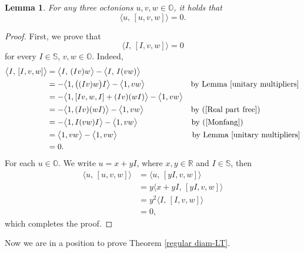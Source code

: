 \documentclass{amsart}
\newtheorem{lemma}[theorem]{Lemma}
\theoremstyle{definition}
\theoremstyle{remark}
\numberwithin{equation}{section}
\begin{document}
\begin{lemma}\label{associator}
For any three octonions $u, v, w\in \mathbb O$, it holds that
\begin{equation}\label{associator01}
 \big\langle u,\, [u, v, w]\big\rangle=0.
\end{equation}
\end{lemma}

\begin{proof}
First, we prove that
$$ \big\langle I,\, [I, v, w]\big\rangle=0$$
for every $I\in\mathbb S$, $v, w\in \mathbb O$. Indeed,
\begin{equation*}
\begin{split}
\big\langle I,\, [I, v, w]\big\rangle
&=\big\langle I,\, (Iv)w\big\rangle-\big\langle I,\,  I(vw)\big\rangle
\\
&=-\big\langle 1, \big((Iv)w\big)I \big\rangle
-\big\langle 1, vw\big\rangle \ \ \,\quad \qquad \qquad \mbox{by Lemma \ref{unitary multipliers}}
\\
&=-\big\langle 1, [Iv, w, I]+ (Iv)(w I) \big\rangle
-\big\langle 1, vw\big\rangle
\\
&=-\big\langle 1, (Iv)(wI) \big\rangle
-\big\langle 1, vw\big\rangle \ \ \   \quad \qquad \qquad \mbox{by (\ref{Real part free})}
\\
&=-\big\langle 1, I(vw) I \big\rangle
-\big\langle 1, vw\big\rangle \ \ \, \qquad \qquad \qquad \mbox{by (\ref{Monfang})}
\\
&=\big\langle 1, vw\big\rangle
-\big\langle 1, vw\big\rangle \ \,\quad\qquad\qquad \qquad \qquad \mbox{by Lemma \ref{unitary multipliers}}
\\
&=0.
\end{split}
\end{equation*}
For each $u\in\mathbb O$. We write $u=x+yI$, where $x, y\in\mathbb R$ and $I\in\mathbb S$, then
\begin{equation*}
\begin{split}
\big\langle u,\, [u, v, w]\big\rangle
&= \big\langle u,\, [yI, v, w]\big\rangle
\\
&= y\big\langle x+yI, \, [yI, v, w]\big\rangle
\\
&= y^2\big\langle I,\, [I, v, w]\big\rangle
\\
&=0,
\end{split}
\end{equation*}
which completes the proof.
\end{proof}

Now we are in a position to prove Theorem \ref{regular diam-LT}.
\end{document}
